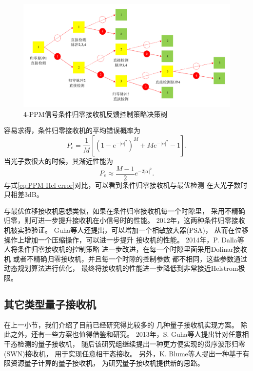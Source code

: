 \begin{figure}
\centering
  \includegraphics[width=\textwidth]{figures/chap2/CPN-Decision-Tree}
  \caption{4-PPM信号条件归零接收机反馈控制策略决策树}
  \label{fig:CPN-Decision-Tree}
\end{figure}

容易求得，条件归零接收机的平均错误概率为\cite{guha2011approaching,dolinar1982near}
\begin{equation}
P_e = \frac{1}{M}[(1-e^{-|\alpha|^2})^M + M e^{-|\alpha|^2} - 1].
\end{equation}
当光子数很大的时候，其渐近性能为
\begin{equation}
P_e \approx \frac{M-1}{2} e^{-2|\alpha|^2}.
\end{equation}
与式\ref{eq:PPM-Hel-error}对比，可以看到条件归零接收机与最优检测
在大光子数时只相差3dB。

与最优位移接收机思想类似，如果在条件归零接收机每一个时隙里，
采用不精确归零，则可进一步提升接收机在小信号时的性能\cite{guha2011approaching}。
2012年，这两种条件归零接收机被实验验证\cite{chen2012optical}。
Guha等人还提出，可以增加一个相敏放大器(PSA)，
从而在位移操作上增加一个压缩操作，可以进一步提升
接收机的性能\cite{guha2011approaching}。
2014年，P. Dalla等人将条件归零接收机的控制策略
进一步改进，在每一个时隙里面采用Dolinar接收机
或者不精确归零接收机，并且每一个时隙的控制参数
都不相同，这些参数通过动态规划算法进行优化，
最终将接收机的性能进一步降低到非常接近Helstrom极限\cite{dalla2014adaptive}。



\subsection{其它类型量子接收机}
在上一小节，我们介绍了目前已经研究得比较多的
几种量子接收机实现方案。
除此之外，还有一些方案也值得借鉴和研究。
2013年，S. Guha等人提出针对任意相干态检测的量子接收机\cite{da2013achieving}，
随后该研究组继续提出一种更方便实现的贯序波形归零(SWN)接收机，
用于实现任意相干态接收\cite{nair2014realizable}。
另外，K. Blume等人提出一种基于有限资源量子计算的量子接收机\cite{blume2012ideal}，
为研究量子接收机提供新的思路。

